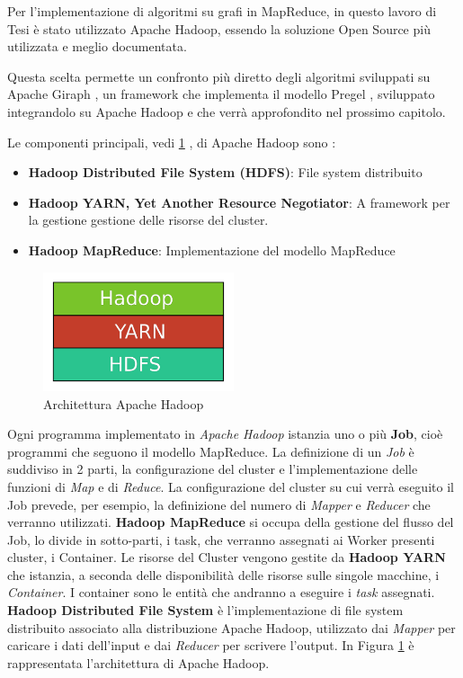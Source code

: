 \documentclass[LaM,binding=0.6cm]{sapthesis}
\begin{document}
Per l'implementazione di algoritmi su grafi in MapReduce, in questo lavoro di Tesi è stato utilizzato Apache Hadoop, essendo la soluzione Open Source più utilizzata e meglio documentata.

Questa scelta permette un confronto più diretto degli algoritmi sviluppati su Apache Giraph \cite{4_giraph.apache.org_2015} , un framework che implementa il modello Pregel \cite{Malewicz:2010:PSL:1807167.1807184}, sviluppato integrandolo su Apache Hadoop e che verrà approfondito nel prossimo capitolo.

Le componenti principali, vedi \ref{fig:layer_hadoop} , di Apache Hadoop sono :
\begin{itemize}
\item \textbf{Hadoop Distributed File System (HDFS)}: File system distribuito
\item \textbf{Hadoop YARN,  Yet Another Resource Negotiator}: A framework per la gestione gestione delle risorse del cluster.
\item \textbf{Hadoop MapReduce}:  Implementazione del modello MapReduce
\end{itemize}

\begin{figure}
\centering
\includegraphics[width=0.5\textwidth]{layer_hadoop}
\caption{Architettura Apache Hadoop}
\label{fig:layer_hadoop}
\end{figure}

Ogni programma implementato in \textit{Apache Hadoop} istanzia uno o più \textbf{Job}, cioè programmi che seguono il modello MapReduce. La definizione di un \textit{Job} è suddiviso in 2 parti, la configurazione del cluster e l'implementazione delle funzioni di \textit{Map} e di \textit{Reduce}. 
La configurazione del cluster su cui verrà eseguito il Job prevede, per esempio, la definizione del numero di \textit{Mapper} e \textit{Reducer} che verranno utilizzati. 
\textbf{Hadoop MapReduce} si occupa della gestione del flusso del Job, lo divide in sotto-parti, i task, che verranno assegnati ai Worker presenti cluster, i Container.
Le risorse del Cluster vengono gestite da \textbf{Hadoop YARN} che istanzia, a seconda delle disponibilità delle risorse sulle singole macchine, i \textit{Container}. I container sono le entità che andranno a eseguire i \textit{task} assegnati.
\textbf{Hadoop Distributed File System} è l'implementazione di file system distribuito associato alla distribuzione Apache Hadoop, utilizzato dai \textit{Mapper} per caricare i dati dell'input e dai \textit{Reducer} per scrivere l'output. In Figura \ref{fig:layer_hadoop} è rappresentata l'architettura di Apache Hadoop.
\end{document}
